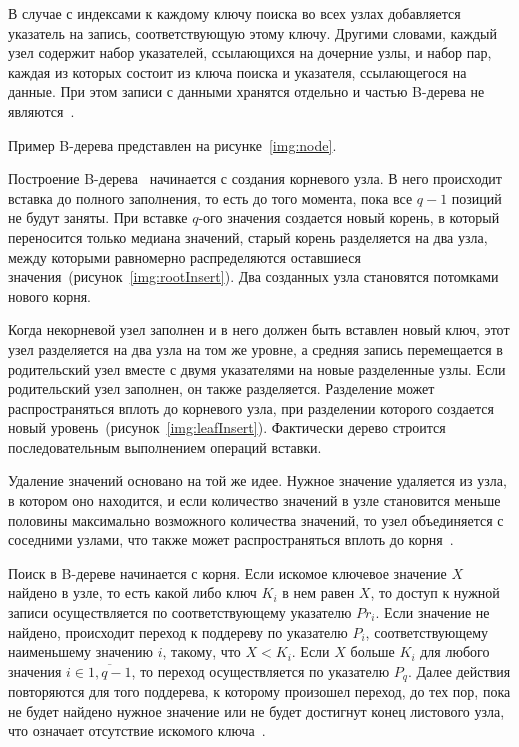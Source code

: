 В случае с индексами к каждому ключу поиска во всех узлах добавляется указатель
на запись, соответствующую этому ключу. Другими словами, каждый узел содержит
набор указателей, ссылающихся на дочерние узлы, и набор пар, каждая из которых
состоит из ключа поиска и указателя, ссылающегося на данные. При этом записи с
данными хранятся отдельно и частью B-дерева не являются~\cite{arki}.

Пример B-дерева представлен на рисунке~\ref{img:node}.


Построение B-дерева~\cite{flatfish} начинается с создания корневого узла. В него
происходит вставка до полного заполнения, то есть до того момента, пока все
$q-1$ позиций не будут заняты. При вставке $q$-ого значения создается новый
корень, в который переносится только медиана значений, старый корень разделяется
на два узла, между которыми равномерно распределяются оставшиеся
значения~(рисунок~\ref{img:rootInsert}). Два созданных узла становятся потомками
нового корня.


Когда некорневой узел заполнен и в него должен быть вставлен новый ключ, этот
узел разделяется на два узла на том же уровне, а средняя запись перемещается в
родительский узел вместе с двумя указателями на новые разделенные узлы. Если
родительский узел заполнен, он также разделяется. Разделение может
распространяться вплоть до корневого узла, при разделении которого создается
новый уровень~(рисунок~\ref{img:leafInsert}). Фактически дерево строится
последовательным выполнением операций вставки.


Удаление значений основано на той же идее. Нужное значение удаляется из узла, в
котором оно находится, и если количество значений в узле становится меньше
половины максимально возможного количества значений, то узел объединяется с
соседними узлами, что также может распространяться вплоть до корня~\cite{marvel}. 

Поиск в B-дереве начинается с корня. Если искомое ключевое значение $X$ найдено
в узле, то есть какой либо ключ $K_i$ в нем равен $X$, то доступ к нужной записи
осуществляется по соответствующему указателю $Pr_i$. Если значение не найдено,
происходит переход к поддереву по указателю $P_i$, соответствующему наименьшему
значению $i$, такому, что $X < K_i$. Если $X$ больше $K_i$ для любого значения
$i \in \overline{1, q - 1}$, то переход осуществляется по указателю $P_q$.
Далее действия повторяются для того поддерева, к которому произошел переход, до
тех пор, пока не будет найдено нужное значение или не будет достигнут конец
листового узла, что означает отсутствие искомого ключа~\cite{arki}.

